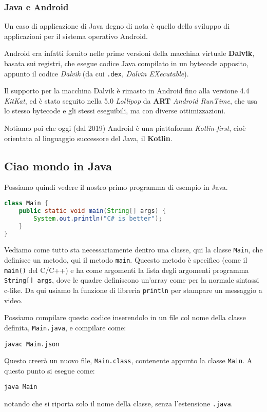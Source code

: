 \documentclass[a4paper,11pt]{article}
\begin{document}
\subsubsection{Java e Android}
Un caso di applicazione di Java degno di nota è quello dello sviluppo di applicazioni per il sistema operativo Android.

Android era infatti fornito nelle prime versioni della macchina virtuale \textbf{Dalvik}, basata sui registri, che esegue codice Java compilato in un bytecode apposito, appunto il codice \textit{Dalvik} (da cui \lstinline|.dex|, \textit{Dalvin EXecutable}).

Il supporto per la macchina Dalvik è rimasto in Android fino alla versione 4.4 \textit{KitKat}, ed è stato seguito nella 5.0 \textit{Lollipop} da \textbf{ART} \textit{Android RunTime}, che usa lo stesso bytecode e gli stessi eseguibili, ma con diverse ottimizzazioni.

Notiamo poi che oggi (dal 2019) Android è una piattaforma \textit{Kotlin-first}, cioè orientata al linguaggio successore del Java, il \textbf{Kotlin}.

\subsection{Ciao mondo in Java}
Possiamo quindi vedere il nostro primo programma di esempio in Java.
\begin{lstlisting}[language=java, style=codestyle]	
class Main {
	public static void main(String[] args) {
		System.out.println("C# is better");
	}
}
\end{lstlisting}

Vediamo come tutto sta necessariamente dentro una classe, qui la classe \lstinline|Main|, che definisce un metodo, qui il metodo \lstinline|main|.
Queesto metodo è specifico (come il \lstinline|main()| del C/C++) e ha come argomenti la lista degli argomenti programma \lstinline|String[] args|, dove le quadre definiscono un'array come per la normale sintassi c-like.
Da qui usiamo la funzione di libreria \lstinline|println| per stampare un messaggio a video.

Possiamo compilare questo codice inserendolo in un file col nome della classe definita, \lstinline|Main.java|, e compilare come:
\begin{lstlisting}[style=shellstyle]
javac Main.json
\end{lstlisting}
Questo creerà un nuovo file, \lstinline|Main.class|, contenente appunto la classe \lstinline|Main|.
A questo punto si esegue come:
\begin{lstlisting}[style=shellstyle]
java Main
\end{lstlisting}
notando che si riporta solo il nome della classe, senza l'estensione \lstinline|.java|.
\end{document}
